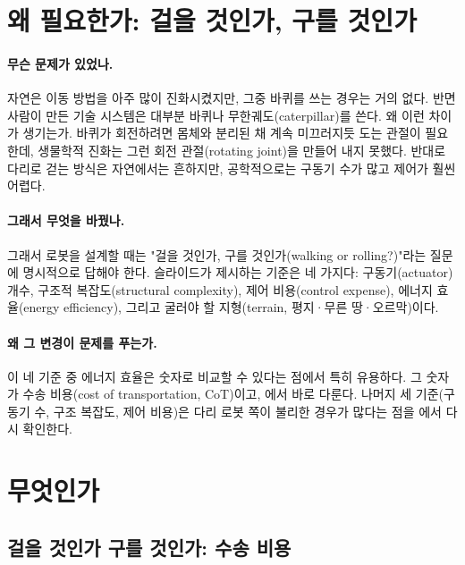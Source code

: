 \section{왜 필요한가: 걸을 것인가, 구를 것인가}
\label{sec:lec02-why}

\paragraph{무슨 문제가 있었나.}
자연은 이동 방법을 아주 많이 진화시켰지만, 그중 바퀴를 쓰는 경우는 거의 없다.
반면 사람이 만든 기술 시스템은 대부분 바퀴나 무한궤도(caterpillar)를 쓴다.
왜 이런 차이가 생기는가. 바퀴가 회전하려면 몸체와 분리된 채 계속 미끄러지듯 도는
관절이 필요한데, 생물학적 진화는 그런 회전 관절(rotating joint)을 만들어 내지
못했다. 반대로 다리로 걷는 방식은 자연에서는 흔하지만, 공학적으로는 구동기 수가
많고 제어가 훨씬 어렵다.

\paragraph{그래서 무엇을 바꿨나.}
그래서 로봇을 설계할 때는 "걸을 것인가, 구를 것인가(walking or rolling?)"라는
질문에 명시적으로 답해야 한다. 슬라이드가 제시하는 기준은 네 가지다:
구동기(actuator) 개수, 구조적 복잡도(structural complexity), 제어 비용(control
expense), 에너지 효율(energy efficiency), 그리고 굴러야 할 지형(terrain, 평지·무른
땅·오르막)이다.

\paragraph{왜 그 변경이 문제를 푸는가.}
이 네 기준 중 에너지 효율은 숫자로 비교할 수 있다는 점에서 특히 유용하다. 그
숫자가 수송 비용(cost of transportation, CoT)이고, 에서
바로 다룬다. 나머지 세 기준(구동기 수, 구조 복잡도, 제어 비용)은 다리 로봇 쪽이
불리한 경우가 많다는 점을 에서 다시 확인한다.

\section{무엇인가}
\label{sec:lec02-what}

\subsection{걸을 것인가 구를 것인가: 수송 비용}
\label{sec:lec02-cot}

